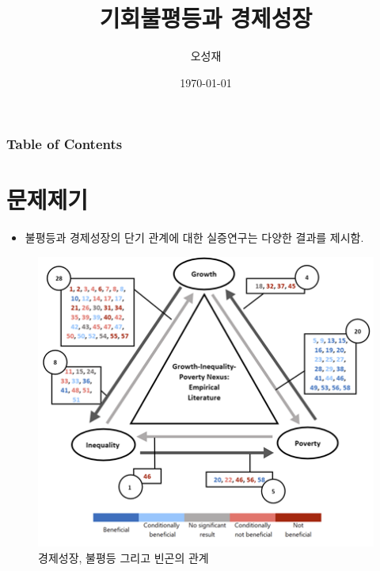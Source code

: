 \documentclass[handout, 10pt]{beamer}
\author{오성재}
\title{기회불평등과 경제성장}
\institute{한남대학교 탈메지이 교양학부}
\date{\today}
\begin{document}
\begin{frame}
    \titlepage
\end{frame}


\begin{frame}
    \frametitle{Table of Contents}
    \tableofcontents[sectionstyle=show,subsectionstyle=show/shaded/hide,subsubsectionstyle=show/shaded/hide]
\end{frame}

\section{문제제기}
\begin{frame}
    \begin{itemize}
        \item 불평등과 경제성장의 단기 관계에 대한 실증연구는 다양한 결과를 제시함.
    \end{itemize}
    \begin{figure}[htpb]
        \begin{center}
            \caption{경제성장, 불평등 그리고 빈곤의 관계}
            \includegraphics[scale=0.35]{pic/triangle_relations.png}
        \end{center}
    \end{figure}
\end{frame}
\end{document}

